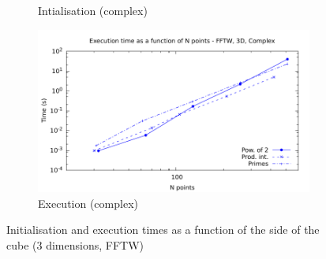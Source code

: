 \documentclass[12pt, a4paper]{article}
\begin{document}
\begin{figure}[H]
\begin{subfigure}{.5\textwidth}
\caption{Intialisation (complex)}
\label{3DFFTWCI}
\end{subfigure}%
\begin{subfigure}{.5\textwidth}
\centering
\includegraphics[width=.9\linewidth]{graphs/3d-fftw-exec-c.pdf}
\caption{Execution (complex)}
\label{3DFFTWC}
\end{subfigure}
\caption{Initialisation and execution times as a function of the side of the cube (3 dimensions, FFTW)}
\label{3DFFTW}
\end{figure}
\end{document}
